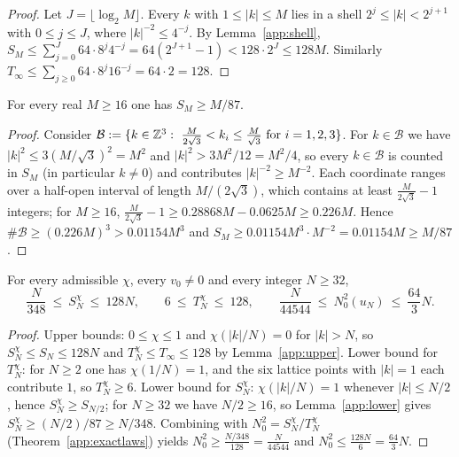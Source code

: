 \begin{proof}
Let $J=\lfloor\log_2M\rfloor$. Every $k$ with $1\le|k|\le M$ lies in a
shell $2^j\le|k|<2^{j+1}$ with $0\le j\le J$, where $|k|^{-2}\le4^{-j}$.
By Lemma~\ref{app:shell},
$S_M\le\sum_{j=0}^{J}64\cdot8^{j}4^{-j}=64(2^{J+1}-1)<128\cdot2^{J}\le128M$.
Similarly $T_\infty\le\sum_{j\ge0}64\cdot8^{j}16^{-j}=64\cdot2=128$.
\end{proof}

\begin{lemma}\label{app:lower}
For every real $M\ge16$ one has $S_M\ge M/87$.
\end{lemma}

\begin{proof}
Consider
$\mathcal B:=\{k\in\mathbb Z^3:\ \tfrac{M}{2\sqrt3}<k_i\le\tfrac{M}{\sqrt3}\
\text{for }i=1,2,3\}$. For $k\in\mathcal B$ we have
$|k|^2\le3(M/\sqrt3)^2=M^2$ and $|k|^2>3M^2/12=M^2/4$, so every
$k\in\mathcal B$ is counted in $S_M$ (in particular $k\neq0$) and
contributes $|k|^{-2}\ge M^{-2}$. Each coordinate ranges over a
half-open interval of length $M/(2\sqrt3)$, which contains at least
$\frac{M}{2\sqrt3}-1$ integers; for $M\ge16$,
$\frac{M}{2\sqrt3}-1\ge0.28868M-0.0625M\ge0.226M$. Hence
$\#\mathcal B\ge(0.226M)^3>0.01154M^3$ and
$S_M\ge0.01154M^3\cdot M^{-2}=0.01154M\ge M/87$.
\end{proof}

\begin{proposition}\label{app:twosided}
For every admissible $\chi$, every $v_0\neq0$ and every integer
$N\ge32$,
\[
\frac{N}{348}\ \le\ S_N^\chi\ \le\ 128N,\qquad
6\ \le\ T_N^\chi\ \le\ 128,\qquad
\frac{N}{44544}\ \le\ N_0^2(u_N)\ \le\ \frac{64}{3}N .
\]
\end{proposition}

\begin{proof}
Upper bounds: $0\le\chi\le1$ and $\chi(|k|/N)=0$ for $|k|>N$, so
$S_N^\chi\le S_N\le128N$ and $T_N^\chi\le T_\infty\le128$ by
Lemma~\ref{app:upper}. Lower bound for $T_N^\chi$: for $N\ge2$ one has
$\chi(1/N)=1$, and the six lattice points with $|k|=1$ each contribute
$1$, so $T_N^\chi\ge6$. Lower bound for $S_N^\chi$: $\chi(|k|/N)=1$
whenever $|k|\le N/2$, hence $S_N^\chi\ge S_{N/2}$; for $N\ge32$ we have
$N/2\ge16$, so Lemma~\ref{app:lower} gives
$S_N^\chi\ge (N/2)/87\ge N/348$. Combining with
$N_0^2=S_N^\chi/T_N^\chi$ (Theorem~\ref{app:exactlaws}) yields
$N_0^2\ge\frac{N/348}{128}=\frac{N}{44544}$ and
$N_0^2\le\frac{128N}{6}=\frac{64}{3}N$.
\end{proof}


